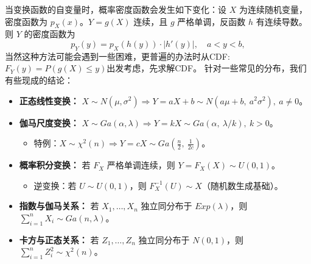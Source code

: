 \documentclass[a4paper]{ctexart}
\begin{document}
当变换函数的自变量时，概率密度函数会发生如下变化：设 $X$ 为连续随机变量，密度函数为 $p_X(x)$。$Y = g(X)$ 连续，且 $g$ 严格单调，反函数 $h$ 有连续导数。则 $Y$ 的密度函数为
\begin{equation}
    p_Y(y) = p_X(h(y)) \cdot |h'(y)|, \quad a < y < b,
\end{equation}
当然这种方法可能会遇到一些困难，更普遍的办法时从CDF:$F_Y(y)=P(g(X)\leq y)$出发考虑，先求解CDF。
针对一些常见的分布，我们有些现成的结论：
\begin{itemize}
    \item \textbf{正态线性变换：} $X \sim N(\mu, \sigma^2) \Rightarrow Y = aX + b \sim N(a\mu + b,\ a^2\sigma^2),\ a \neq 0$。
    
    \item \textbf{伽马尺度变换：} $X \sim Ga(\alpha, \lambda) \Rightarrow Y = kX \sim Ga(\alpha,\ \lambda/k),\ k > 0$。
    \begin{itemize}
        \item 特例：$X \sim \chi^2(n) \Rightarrow Y = cX \sim Ga\left(\frac{n}{2},\ \frac{1}{2c}\right)$。
    \end{itemize}
    
    \item \textbf{概率积分变换：} 若 $F_X$ 严格单调连续，则 $Y = F_X(X) \sim U(0,1)$。
    \begin{itemize}
        \item 逆变换：若 $U \sim U(0,1)$，则 $F_X^{-1}(U) \sim X$（随机数生成基础）。
    \end{itemize}
    
    \item \textbf{指数与伽马关系：} 若 $X_1,\ldots,X_n$ 独立同分布于 $Exp(\lambda)$，则 $\sum_{i=1}^n X_i \sim Ga(n,\lambda)$。
    
    \item \textbf{卡方与正态关系：} 若 $Z_1,\ldots,Z_n$ 独立同分布于 $N(0,1)$，则 $\sum_{i=1}^n Z_i^2 \sim \chi^2(n)$。
    
\end{itemize}
\end{document}

